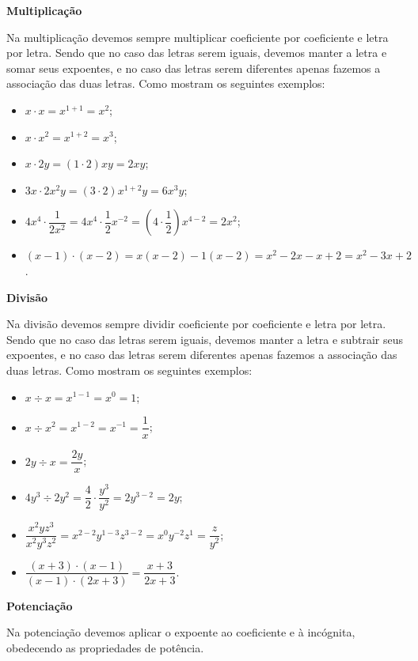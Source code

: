   \vskip0.3cm

 \textbf{Multiplicação}

 Na multiplicação devemos sempre multiplicar coeficiente por coeficiente e letra por letra. Sendo que no caso das letras serem iguais, devemos manter a letra e somar seus expoentes, e no caso das letras serem diferentes apenas fazemos a associação das duas letras. Como mostram os seguintes exemplos:

  \begin{itemize}
   \item $x \cdot x = x^{1+1}= x^2$;
   \item $x \cdot x^2= x^{1+2}= x^3$;
   \item $x \cdot 2y= (1 \cdot 2)xy= 2xy$;
   \item $3x \cdot 2x^2y= (3 \cdot 2)x^{1+2}y= 6x^3y$;
   \item $4x^4 \cdot \dfrac{1}{2x^{2}}= 4x^4 \cdot \dfrac{1}{2}x^{-2}= (4 \cdot \dfrac{1}{2})x^{4-2}= 2x^2$;
   \item $(x - 1) \cdot (x - 2)= x(x-2) - 1(x-2)= x^2 -2x -x +2= x^2 - 3x + 2$.
  \end{itemize}

  \vskip0.3cm

   \textbf{Divisão}

   Na divisão devemos sempre dividir coeficiente por coeficiente e letra por letra. Sendo que no caso das letras serem iguais, devemos manter a letra e subtrair seus expoentes, e no caso das letras serem diferentes apenas fazemos a associação das duas letras. Como mostram os seguintes exemplos:

  \begin{itemize}
   \item $x \div x= x^{1-1}= x^0= 1$;
   \item $x \div x^2= x^{1-2}= x^{-1}= \dfrac{1}{x}$;
   \item $2y \div x= \dfrac{2y}{x}$;
   \item $4y^3 \div 2y^2= \dfrac{4}{2} \cdot \dfrac{y^3}{y^2}= 2y^{3-2}= 2y$;
   \item $\dfrac{x^2yz^3}{x^2y^3z^2}= x^{2-2}y^{1-3}z^{3-2}= x^0 y^{-2}z^{1}= \dfrac{z}{y^2}$;
   \item $\dfrac{(x+3) \cdot (x-1)}{(x-1)\cdot (2x+3)}= \dfrac{x+3}{2x+3}$.
  \end{itemize}

 \vskip0.3cm

  \textbf{Potenciação}

  Na potenciação devemos aplicar o expoente ao coeficiente e à incógnita, obedecendo as propriedades de potência.

